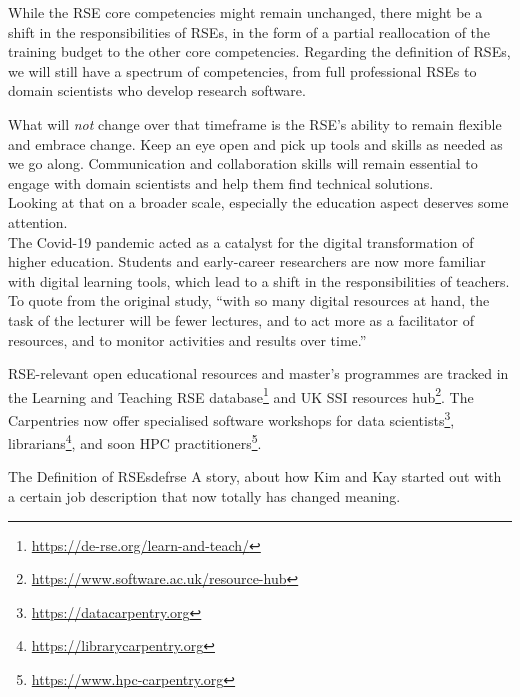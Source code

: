 \documentclass{eceasst}
\begin{document}
While the RSE core competencies\cite{Goth2024} might remain unchanged,
there might be a shift in the responsibilities of RSEs,
in the form of a partial reallocation of the training budget
to the other core competencies.
Regarding the definition of RSEs, we will still have a spectrum of competencies,
from full professional RSEs to domain scientists who develop research software.

What will \emph{not} change over that timeframe is the RSE's ability to remain
flexible and embrace change. Keep an eye open and pick up tools and skills
as needed as we go along.
Communication and collaboration skills will remain essential to engage
with domain scientists and help them find technical solutions.\\

Looking at that on a broader scale, especially the education aspect deserves some attention.\\
The Covid-19 pandemic acted as a catalyst for the digital transformation
of higher education\cite{Bygstad2022}. Students and early-career researchers
are now more familiar with digital learning tools, which lead to a shift
in the responsibilities of teachers. To quote from the original study,
``with so many digital resources at hand,
the task of the lecturer will be fewer lectures,
and to act more as a facilitator of resources,
and to monitor activities and results over time.''\cite{Bygstad2022}

RSE-relevant open educational resources and master's programmes are tracked
in the Learning and Teaching RSE database\footnote{\url{https://de-rse.org/learn-and-teach/}}
and UK SSI resources hub\footnote{\url{https://www.software.ac.uk/resource-hub}}.
The Carpentries now offer specialised software workshops
for data scientists\footnote{\url{https://datacarpentry.org}},
librarians\footnote{\url{https://librarycarpentry.org}},
and soon HPC practitioners\footnote{\url{https://www.hpc-carpentry.org}}.

\begin{story}{The Definition of RSEs}{defrse}
A story, about how Kim and Kay started out with a certain job description that now totally
has changed meaning.
\end{story}
\end{document}
